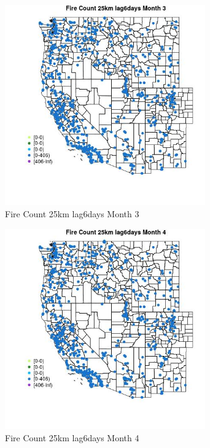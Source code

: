\begin{figure} 
\centering  
\includegraphics[width=0.77\textwidth]{Code_Outputs/Report_ML_input_PM25_Step4_part_f_de_duplicated_aves_prioritize_24hr_obswNAs_MapObsMo3Fire_Count_25km_lag6days.jpg} 
\caption{\label{fig:Report_ML_input_PM25_Step4_part_f_de_duplicated_aves_prioritize_24hr_obswNAsMapObsMo3Fire_Count_25km_lag6days}Fire Count 25km lag6days Month 3} 
\end{figure} 
 

\begin{figure} 
\centering  
\includegraphics[width=0.77\textwidth]{Code_Outputs/Report_ML_input_PM25_Step4_part_f_de_duplicated_aves_prioritize_24hr_obswNAs_MapObsMo4Fire_Count_25km_lag6days.jpg} 
\caption{\label{fig:Report_ML_input_PM25_Step4_part_f_de_duplicated_aves_prioritize_24hr_obswNAsMapObsMo4Fire_Count_25km_lag6days}Fire Count 25km lag6days Month 4} 
\end{figure} 
 


